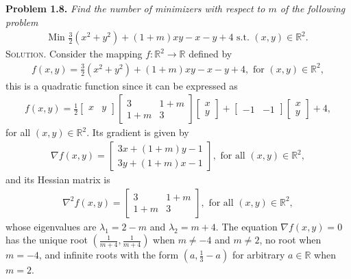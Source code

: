 \documentclass[a4paper]{article}
\numberwithin{equation}{section}
\begin{document}
\textbf{Problem 1.8.} \textit{Find the number of minimizers with respect to $m$ of the following problem}
\begin{align}
\mbox{Min }\frac{3}{2}\left( {{x^2} + {y^2}} \right) + \left( {1 + m} \right)xy - x - y + 4 \mbox{ s.t. }\left( {x,y} \right) \in {\mathbb{R}^2}.
\end{align}
\textsc{Solution.} Consider the mapping $f:\mathbb{R}^2\to \mathbb{R}$ defined by
\begin{align}
f\left( {x,y} \right) = \frac{3}{2}\left( {{x^2} + {y^2}} \right) + \left( {1 + m} \right)xy - x - y + 4, \mbox{ for }\left( {x,y} \right) \in {\mathbb{R}^2},
\end{align}
this is a quadratic function since it can be expressed as
\begin{align}
f\left( {x,y} \right) = \frac{1}{2}\left[ {\begin{array}{*{20}{c}}
x&y
\end{array}} \right]\left[ {\begin{array}{*{20}{c}}
3&{1 + m}\\
{1 + m}&3
\end{array}} \right]\left[ {\begin{array}{*{20}{c}}
x\\
y
\end{array}} \right] + \left[ {\begin{array}{*{20}{c}}
{ - 1}&{ - 1}
\end{array}} \right]\left[ {\begin{array}{*{20}{c}}
x\\
y
\end{array}} \right] + 4,
\end{align}
for all $\left(x,y\right)\in \mathbb{R}^2$. Its gradient is given by
\begin{align}
\nabla f\left( {x,y} \right) = \left[ {\begin{array}{*{20}{c}}
{3x + \left( {1 + m} \right)y - 1}\\
{3y + \left( {1 + m} \right)x - 1}
\end{array}} \right], \mbox{ for all } \left( {x,y} \right) \in {\mathbb{R}^2},
\end{align}
and its Hessian matrix is 
\begin{align}
{\nabla ^2}f\left( {x,y} \right) = \left[ {\begin{array}{*{20}{c}}
3&{1 + m}\\
{1 + m}&3
\end{array}} \right], \mbox{ for all } \left( {x,y} \right) \in {\mathbb{R}^2},
\end{align}
whose eigenvalues are $\lambda _1 =2-m$ and $\lambda _2=m+4$. The equation $\nabla f\left( {x,y} \right) = 0$ has the unique root $\left(\frac{1}{m+4},\frac{1}{m+4}\right)$ when $m\ne -4$ and $m\ne 2$, no root when $m=-4$, and infinite roots with the form $\left(a,\frac{1}{3}-a\right)$ for arbitrary $a\in \mathbb{R}$ when $m=2$. 
\end{document}
